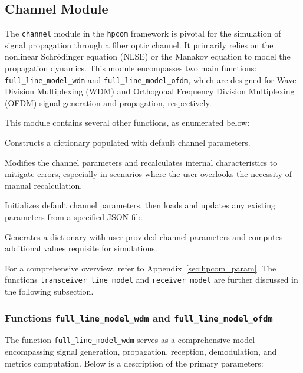 \subsection{Channel Module}
The \texttt{channel} module in the \texttt{hpcom} framework is pivotal for the simulation of signal propagation through a fiber optic channel. It primarily relies on the nonlinear Schrödinger equation (NLSE) or the Manakov equation to model the propagation dynamics. This module encompasses two main functions: \texttt{full\_line\_model\_wdm} and \texttt{full\_line\_model\_ofdm}, which are designed for Wave Division Multiplexing (WDM) and Orthogonal Frequency Division Multiplexing (OFDM) signal generation and propagation, respectively.

This module contains several other functions, as enumerated below:
\begin{description}[style=multiline, leftmargin=7.7cm, font=\normalfont]
    \item[\texttt{get\_default\_channel\_parameters}] Constructs a dictionary populated with default channel parameters.
    \item[\texttt{update\_channel\_parameters}] Modifies the channel parameters and recalculates internal characteristics to mitigate errors, especially in scenarios where the user overlooks the necessity of manual recalculation.
    \item[\texttt{update\_channel\_parameters\_from\_json}] Initializes default channel parameters, then loads and updates any existing parameters from a specified JSON file.
    \item[\texttt{create\_channel\_parameters}] Generates a dictionary with user-provided channel parameters and computes additional values requisite for simulations.
\end{description}
For a comprehensive overview, refer to Appendix~\ref{sec:hpcom_param}. The functions \texttt{transceiver\_line\_model} and \texttt{receiver\_model} are further discussed in the following subsection.


\subsubsection{Functions \texttt{full\_line\_model\_wdm} and \texttt{full\_line\_model\_ofdm}}
The function \texttt{full\_line\_model\_wdm} serves as a comprehensive model encompassing signal generation, propagation, reception, demodulation, and metrics computation. Below is a description of the primary parameters:

